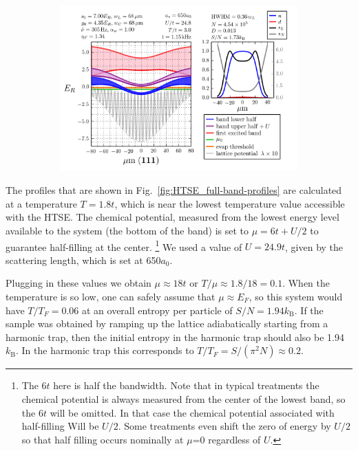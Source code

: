 \documentclass[11pt,letter]{article}
\newcommand{\kb}{\ensuremath{k_{\text{B}}}}
\begin{document}
\begin{itemize}
\begin{figure}[H]
        \begin{subfigure}[t]{0.42\textwidth}
		\includegraphics[width=\textwidth]{figures_hubbard-lda/008.png}
\caption{ }
                \label{fig:profiles008}
        \end{subfigure}
	\caption{}
\end{figure}

\end{itemize}

\newpage

The profiles that are shown in Fig.~\ref{fig:HTSE_full-band-profiles} are
calculated at a temperature $T=1.8t$, which is near the lowest temperature
value accessible with the HTSE.   The chemical potential, measured from the
lowest energy level available to the system (the bottom of the band) is set to
$\mu=6t +U/2$ to guarantee half-filling at the center.  \footnote{ The $6t$
here is half the bandwidth.  Note that in typical treatments the chemical
potential is always measured from the center of the lowest band, so the $6t$
will be omitted. In that case the chemical potential associated with
half-filling Will be $U/2$.  Some treatments even shift the zero of energy by
$U/2$ so that half filling occurs nominally at $\mu$=0 regardless of $U$. } We
used a value of $U=24.9t$,  given by the scattering length, which is set at
650$a_{0}$.   

Plugging in these values we obtain $\mu\approx 18 t$  or $T/\mu \approx 1.8/18
= 0.1 $.  When the temperature is so low, one can safely assume that $\mu
\approx E_{F}$,  so this system would have  $T/T_{F}=0.06$ at an overall
entropy per particle of $S/N=1.94\kb$.  If the sample was obtained by ramping
up the lattice adiabatically starting from a harmonic trap, then the initial
entropy in the harmonic trap should also be 1.94\kb.  In the harmonic trap this
corresponds to $T/T_{F} = S/(\pi^{2} N) \approx 0.2$.  
\end{document}
